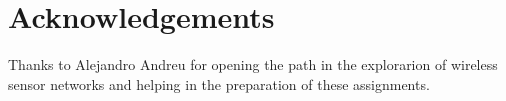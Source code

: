 \chapter*{Acknowledgements}

Thanks to Alejandro Andreu for opening the path in the explorarion of wireless sensor networks and helping in the preparation of these assignments.

